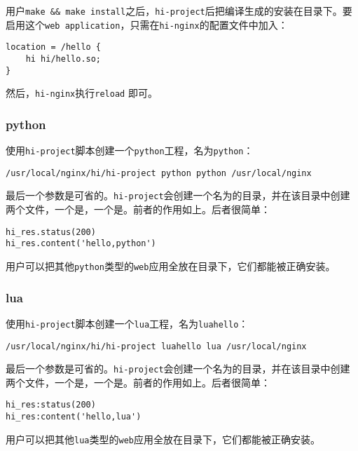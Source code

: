 用户\texttt{make \&\& make install}之后，\texttt{hi-project}后把编译生成的安装在目录下。要启用这个\texttt{web application}，只需在\texttt{hi-nginx}的配置文件中加入：
\begin{lstlisting}
location = /hello {
	hi hi/hello.so;
}
\end{lstlisting}
然后，\texttt{hi-nginx}执行\texttt{reload} 即可。


\subsubsection{python}
使用\texttt{hi-project}脚本创建一个\texttt{python}工程，名为\texttt{python}：
\begin{lstlisting}
/usr/local/nginx/hi/hi-project python python /usr/local/nginx
\end{lstlisting}
最后一个参数是可省的。\texttt{hi-project}会创建一个名为的目录，并在该目录中创建两个文件，一个是，一个是。前者的作用如上。后者很简单：
\begin{lstlisting}
hi_res.status(200)
hi_res.content('hello,python')
\end{lstlisting}
用户可以把其他\texttt{python}类型的\texttt{web}应用全放在目录下，它们都能被正确安装。

\subsubsection{lua}
使用\texttt{hi-project}脚本创建一个\texttt{lua}工程，名为\texttt{luahello}：
\begin{lstlisting}
/usr/local/nginx/hi/hi-project luahello lua /usr/local/nginx
\end{lstlisting}
最后一个参数是可省的。\texttt{hi-project}会创建一个名为的目录，并在该目录中创建两个文件，一个是，一个是。前者的作用如上。后者很简单：
\begin{lstlisting}
hi_res:status(200)
hi_res:content('hello,lua')
\end{lstlisting}
用户可以把其他\texttt{lua}类型的\texttt{web}应用全放在目录下，它们都能被正确安装。

